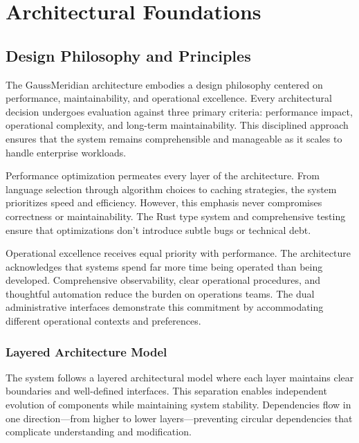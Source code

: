\documentclass[12pt,a4paper,twoside]{report}
\begin{document}
\tableofcontents
\listoffigures
\listoftables


\chapter{Architectural Foundations}

\section{Design Philosophy and Principles}

The GaussMeridian architecture embodies a design philosophy centered on performance, maintainability, and operational excellence. Every architectural decision undergoes evaluation against three primary criteria: performance impact, operational complexity, and long-term maintainability. This disciplined approach ensures that the system remains comprehensible and manageable as it scales to handle enterprise workloads.

Performance optimization permeates every layer of the architecture. From language selection through algorithm choices to caching strategies, the system prioritizes speed and efficiency. However, this emphasis never compromises correctness or maintainability. The Rust type system and comprehensive testing ensure that optimizations don't introduce subtle bugs or technical debt.

Operational excellence receives equal priority with performance. The architecture acknowledges that systems spend far more time being operated than being developed. Comprehensive observability, clear operational procedures, and thoughtful automation reduce the burden on operations teams. The dual administrative interfaces demonstrate this commitment by accommodating different operational contexts and preferences.

\subsection{Layered Architecture Model}

The system follows a layered architectural model where each layer maintains clear boundaries and well-defined interfaces. This separation enables independent evolution of components while maintaining system stability. Dependencies flow in one direction—from higher to lower layers—preventing circular dependencies that complicate understanding and modification.
\end{document}
